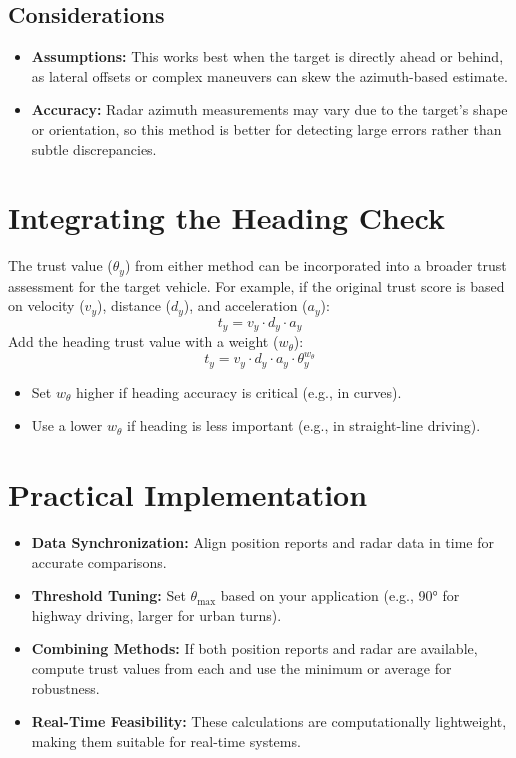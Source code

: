 \documentclass{article}
\begin{document}
\subsection*{Considerations}
\begin{itemize}
    \item \textbf{Assumptions:} This works best when the target is directly ahead or behind, as lateral offsets or complex maneuvers can skew the azimuth-based estimate.
    \item \textbf{Accuracy:} Radar azimuth measurements may vary due to the target's shape or orientation, so this method is better for detecting large errors rather than subtle discrepancies.
\end{itemize}

\section*{Integrating the Heading Check}
The trust value (\(\theta_y\)) from either method can be incorporated into a broader trust assessment for the target vehicle. For example, if the original trust score is based on velocity (\(v_y\)), distance (\(d_y\)), and acceleration (\(a_y\)):
\[
t_y = v_y \cdot d_y \cdot a_y
\]
Add the heading trust value with a weight (\(w_\theta\)):
\[
t_y = v_y \cdot d_y \cdot a_y \cdot \theta_y^{w_\theta}
\]
\begin{itemize}
    \item Set \(w_\theta\) higher if heading accuracy is critical (e.g., in curves).
    \item Use a lower \(w_\theta\) if heading is less important (e.g., in straight-line driving).
\end{itemize}

\section*{Practical Implementation}
\begin{itemize}
    \item \textbf{Data Synchronization:} Align position reports and radar data in time for accurate comparisons.
    \item \textbf{Threshold Tuning:} Set \(\theta_{\text{max}}\) based on your application (e.g., 90° for highway driving, larger for urban turns).
    \item \textbf{Combining Methods:} If both position reports and radar are available, compute trust values from each and use the minimum or average for robustness.
    \item \textbf{Real-Time Feasibility:} These calculations are computationally lightweight, making them suitable for real-time systems.
\end{itemize}
\end{document}
